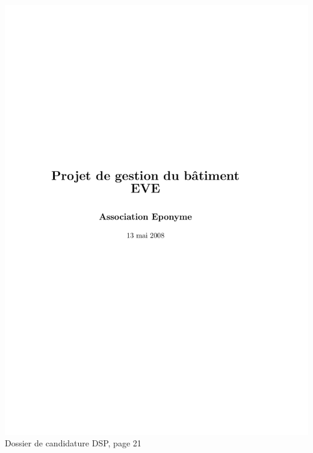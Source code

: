 \includegraphics[scale=0.85,trim=20mm 20mm 20mm 20mm,clip,page=21]{annexes/candidature_dsp.pdf} \\
Dossier de candidature DSP, page 21
\newpage
